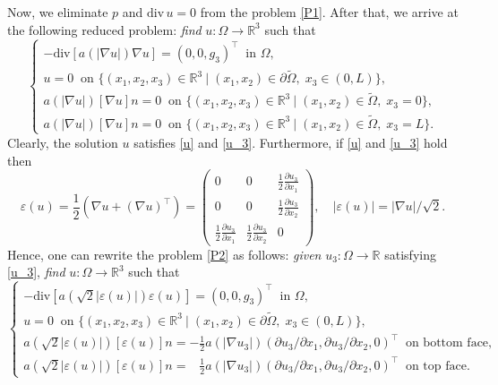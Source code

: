 \documentclass[12pt]{article}
\numberwithin{equation}{section}
\begin{document}
Now, we eliminate $p$ and $\mathrm{div}\,u=0$ from the problem \eqref{P1}. After that, we arrive at the following reduced problem:
\textit{find} $u\colon\Omega\rightarrow\mathbb R^3$ such that
\begin{equation}
	\left\{\begin{array}{l}
		-\mathrm{div}[a(|\nabla u|)\nabla u]=(0,0,g_3)^\top\;\;\mbox{in }\Omega,\\
		u=0 \;\;\mbox{on }\{(x_1,x_2,x_3)\in\mathbb R^3\ |\; (x_1,x_2)\in\partial\widetilde\Omega,\;x_3\in(0,L)\},\\
		a(|\nabla u|)[\nabla u] n=0 \;\;\mbox{on }\{(x_1,x_2,x_3)\in\mathbb R^3\ |\; (x_1,x_2)\in\widetilde\Omega,\;x_3=0\},\\
		a(|\nabla u|)[\nabla u] n=0 \;\;\mbox{on }\{(x_1,x_2,x_3)\in\mathbb R^3\ |\; (x_1,x_2)\in\widetilde\Omega,\;x_3=L\}.
	\end{array}
	\right.
	\label{P2}
\end{equation}
Clearly, the solution $u$ satisfies \eqref{u} and \eqref{u_3}. Furthermore, if \eqref{u} and \eqref{u_3} hold then 
$$\varepsilon(u)=\frac{1}{2}(\nabla u+(\nabla u)^\top)=\left(
\begin{array}{ccc}
	0 & 0 & \frac12\frac{\partial u_3}{\partial x_1}\\
	0 & 0 & \frac12\frac{\partial u_3}{\partial x_2}\\
	\frac12\frac{\partial u_3}{\partial x_1} & \frac12\frac{\partial u_3}{\partial x_2} & 0
\end{array}
\right),\quad |\varepsilon(u)|=|\nabla u|/\sqrt{2}.$$
Hence, one can rewrite the problem \eqref{P2} as follows: \textit{given} $u_3\colon\Omega\rightarrow\mathbb R$ satisfying \eqref{u_3}, \textit{find} $u\colon\Omega\rightarrow\mathbb R^3$ such that
\begin{equation}
	\left\{\begin{array}{l}
		-\mathrm{div}[a(\sqrt2|\varepsilon(u)|)\varepsilon(u)]=(0,0,g_3)^\top\;\;\mbox{in }\Omega,\\
		u=0 \;\;\mbox{on }\{(x_1,x_2,x_3)\in\mathbb R^3\ |\; (x_1,x_2)\in\partial\widetilde\Omega,\;x_3\in(0,L)\},\\
		a(\sqrt2|\varepsilon(u)|)[\varepsilon(u)] n=-\frac{1}{2}a(|\nabla u_3|)(\partial u_3/\partial x_1, \partial u_3/\partial x_2, 0)^\top \;\;\mbox{on bottom face},\\
		a(\sqrt2|\varepsilon(u)|)[\varepsilon(u)] n=\;\;\:\frac{1}{2}a(|\nabla u_3|)(\partial u_3/\partial x_1, \partial u_3/\partial x_2, 0)^\top \;\;\mbox{on top face}.
	\end{array}
	\right.
	\label{P3}
\end{equation}
\end{document}
